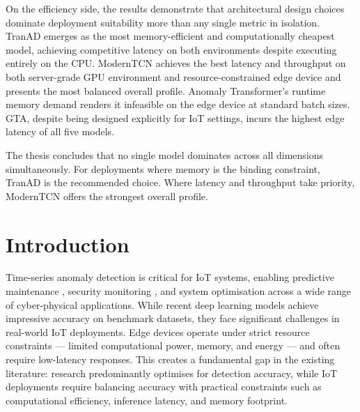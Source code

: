\documentclass[twoside,11pt,openright]{report}
\begin{document}
On the efficiency side, the results demonstrate that architectural design choices
dominate deployment suitability more than any single metric in isolation. TranAD
emerges as the most memory-efficient and computationally cheapest model, achieving
competitive latency on both environments despite executing entirely on the CPU. 
ModernTCN achieves the best latency and
throughput on both server-grade GPU environment and
resource-constrained edge device and presents the most balanced overall profile.
Anomaly Transformer's runtime memory demand renders it infeasible on the edge
device at standard batch sizes. GTA, despite being designed explicitly for IoT
settings, incurs the highest edge latency of all five models.

The thesis concludes that no single model dominates across all dimensions
simultaneously. For deployments where memory is the binding constraint, TranAD
is the recommended choice. Where latency and throughput take priority, ModernTCN
offers the strongest overall profile.


\tableofcontents
\cleardoublepage
{}
\setcounter{secnumdepth}{2}


\chapter{Introduction}
\label{ch:intro}

Time-series anomaly detection is critical for IoT systems, enabling predictive
maintenance \citep{choi2021deeplearning}, security monitoring \citep{jeffrey2023review},
and system optimisation \citep{sgueglia2022iot} across a wide range of
cyber-physical applications. While recent deep learning
models achieve impressive accuracy on benchmark datasets, they face significant
challenges in real-world IoT deployments. Edge devices operate under strict resource
constraints --- limited computational power, memory, and energy --- and often require
low-latency responses. This creates a fundamental gap in
the existing literature: research predominantly optimises for detection accuracy,
while IoT deployments require balancing accuracy with practical constraints such as
computational efficiency, inference latency, and memory footprint.
\end{document}
